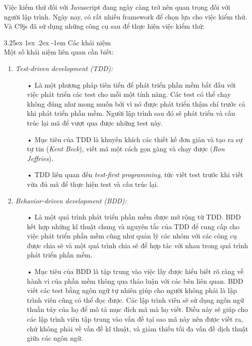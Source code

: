 \documentclass[12pt,a4paper]{article}
\makeatletter
\let\newcounter\@gobble\let\setcounter\@gobbletwo
\newcommand{\myparagraph}[1]{\paragraph{#1}\mbox{}\\} %
\newcounter{subsubsubsection}[subsubsection]
\renewcommand\paragraph{\@startsection{paragraph}{5}{\z@}%
  {3.25ex \@plus1ex \@minus.2ex}%
  {-1em}%
  {\normalfont\normalsize\bfseries}}
\makeatother
\begin{document}
Việc kiểm thử đối với Javascript đang ngày càng trở nên quan trọng đối với người lập trình. Ngày nay, có rất nhiều framework để chọn lựa cho việc kiểm thử. Và C9js đã sử dụng những công cụ sau để thực hiện việc kiểm thử:

\myparagraph{Các khái niệm}
Một số khái niệm liên quan cần biết:
\begin{enumerate}
\item \emph{Test-driven development (TDD)\cite{tdd_1}:}
\begin{itemize}
\item[•] Là một phương pháp tiên tiến để phát triển phần mềm bắt đầu với việc phát triển các test cho mỗi một tính năng. Các test có thể chạy không đúng như mong muốn bởi vì nó được phát triển thậm chí trước cả khi phát triển phần mềm. Người lập trình sau đó sẽ phát triển và cấu trúc lại mã để vượt qua được những test này. 
\item[•] Mục tiêu của TDD là khuyến khích các thiết kế đơn giản và tạo ra sự tự tin (\textit{Kent Beck}), viết mã một cách gọn gàng và chạy được (\textit{Ron Jeffries}).
\item[•] TDD liên quan đến \textit{test-first programming}, tức viết test trước khi viết vừa đủ mã để thực hiện test và cấu trúc lại.
\end{itemize}

\item \emph{Behavior-driven development (BDD)\cite{bdd_1}:}
\begin{itemize}
\item[•] Là một quá trình phát triển phần mềm được mở rộng từ TDD. BDD kết hợp những kĩ thuật chung và nguyên tắc của TDD để cung cấp cho việc phát triển phần mềm cũng như quản lý các nhóm với các công cụ được chia sẽ và một quá trình chia sẽ để hợp tác với nhau trong quá trình phát triển phần mềm.
\item[•] Mục tiêu của BDD là tập trung vào việc lấy được hiểu biết rõ ràng về hành vi của phần mềm thông qua thảo luận với các bên liên quan. BDD viết các test bằng ngôn ngữ tự nhiên giúp cho người không phải là lập trình viên cũng có thể đọc được. Các lập trình viên sẽ sử dụng ngôn ngữ thuần túy của họ để mô tả mục đích mã mà họ viết. Điều này sẽ giúp cho các lập trình viên tập trung vào vấn đề tại sao mã này nên được viết ra, chứ không phải về vấn đề kĩ thuật, và giảm thiểu tối đa vấn đề dịch thuật giữa các ngôn ngữ.
\end{itemize}
\end{enumerate}
\end{document}

